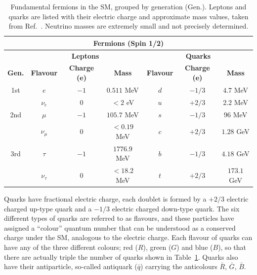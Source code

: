 \begin{table}[htbp]
    \centering
    \caption{Fundamental fermions in the SM, grouped by generation (Gen.). Leptons and quarks are listed with their electric charge and approximate mass values, taken from Ref.~\cite{PhysRevD.98.030001}. Neutrino masses are extremely small and not precisely determined.}
    \small %
    \renewcommand{\arraystretch}{1.2} %
    \setlength{\tabcolsep}{6pt} %
    \begin{tabular}{cccc|ccc}
    \multicolumn{7}{c}{\textbf{Fermions (Spin 1/2)}} \\
    \toprule
     & \multicolumn{3}{c|}{\textbf{Leptons}} & \multicolumn{3}{c}{\textbf{Quarks}} \\
    \midrule
    \textbf{Gen.} & \textbf{Flavour} & \textbf{Charge (e)} & \textbf{Mass} & 
                   \textbf{Flavour} & \textbf{Charge (e)} & \textbf{Mass} \\
    \midrule
    1st & $e$ & $-1$ & $0.511$ MeV & $d$ & $-1/3$ & $4.7$ MeV \\
        & $\nu_e$ & $0$ & $<2$ eV & $u$ & $+2/3$ & $2.2$ MeV \\
    2nd & $\mu$ & $-1$ & $105.7$ MeV & $s$ & $-1/3$ & $96$ MeV \\
        & $\nu_\mu$ & $0$ & $<0.19$ MeV & $c$ & $+2/3$ & $1.28$ GeV \\
    3rd & $\tau$ & $-1$ & $1776.9$ MeV & $b$ & $-1/3$ & $4.18$ GeV \\
        & $\nu_\tau$ & $0$ & $<18.2$ MeV & $t$ & $+2/3$ & $173.1$ GeV \\
    \bottomrule
    \end{tabular}
    \label{tab:fermions}
\end{table}


Quarks have fractional electric charge, each doublet is formed by a $+2/3$ electric charged up-type quark and a $-1/3$ electric charged down-type quark. The six different types of quarks are referred to as flavours, and these particles have assigned a ``colour'' quantum number that can be understood as a conserved charge under the SM, analogous to the electric charge. Each flavour of quarks can have any of the three different colours;
red ($R$), green ($G$) and blue ($B$), so that there are actually triple the number of quarks
shown in Table~\ref{tab:fermions}. Quarks also have their antiparticle, so-called antiquark ($\bar{q}$) carrying
the anticolours $\bar{R}$, $\bar{G}$, $\bar{B}$.

